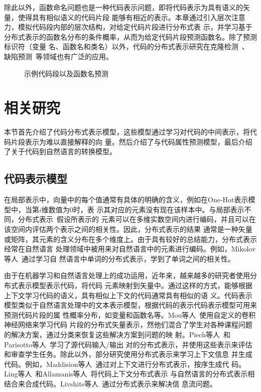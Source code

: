 除此以外，函数命名问题也是一种代码表示问题，即将代码表示为具有语义的矢量，使得具有相似语义的代码片段
能够有相近的表示。本章通过引入层次注意力，模拟代码段内部的层次结构，对给定代码片段进行分布式表
示，并学习基于分布式表示的函数名分布的条件概率，从而为给定代码片段预测函数名。除了预测标识符（变量
名、函数名和类名）以外，代码的分布式表示研究在克隆检测~\cite{white2016deep,allamanis2018learning}、
缺陷预测~\cite{murali2017finding}等领域也有广泛的应用。

\begin{figure}
\centering
{}
\hfill
{}
\caption{示例代码段以及函数名预测}
\label{stop}
\end{figure}

\section{相关研究}
本节首先介绍了代码分布式表示模型，这些模型通过学习对代码的中间表示，将代码片段表示为难以直接解释的向
量。然后介绍了与代码属性预测模型，最后介绍了关于代码到自然语言的转换模型。

\subsection{代码表示模型}
在局部表示中，向量中的每个值通常有具体的明确的含义，例如在One-Hot表示模型中，当第$i$维数值为0时，表
示其对应的元素没有现在该样本中。与局部表示不同，分布式表示~\cite{hinton1984distributed}假设所表示的
元素可以在多维实数空间内进行编码，并且可以在该空间内评估两个表示之间的相关性。因此，分布式表示的结果
通常是一种矢量或矩阵，其元素的含义分布在多个维度上。由于具有较好的总结能力，分布式表示经常在自然语言
处理领域中被用来对自然语言中的元素进行编码。例如，Mikolov等人~\cite{mikolov2013efficient}通过学习自
然语言中单词的分布式表示，学到了单词之间的相关性。

由于在机器学习和自然语言处理上的成功运用，近年来，越来越多的研究者使用分布式表示模型表示代码，将代码
元素映射到矢量中。通过这样的方式，能够根据上下文学习代码的语义，具有相似上下文的代码通常具有相似的语
义。代码表示模型类似于自然语言处理中的文本表示模型，根据代码的表示代码表示模型可用来预测代码片段的属
性概率分布，如变量和函数名等。Mou等人~\cite{mou2016convolutional}使用自定义的卷积神经网络来学习代码
片段的分布式矢量表示，然他们混合了学生对各种课程问题的解决方案，通过分类来恢复这些解决方案到问题的映
射。Piech等人~\cite{piech2015learning}和Parisotto等人~\cite{parisotto2017neuro}学习了源代码输入/输出
对的分布式表示，并使用这些表示来评估和审查学生任务。除此以外，部分研究使用分布式表示来学习上下文信息
并生成代码。例如，Maddision等人~\cite{maddison2014structured}通过对上下文进行分布式表示，按序生成代
码。Ling等人~\cite{ling2016latent}和Allamanis等人~\cite{allamanis2015bimodal}将代码上下文分布式表示
与自然语言的分布式表示相结合来合成代码。Livshits等人~\cite{livshits2009merlin}通过分布式表示来解决信
息流问题。

